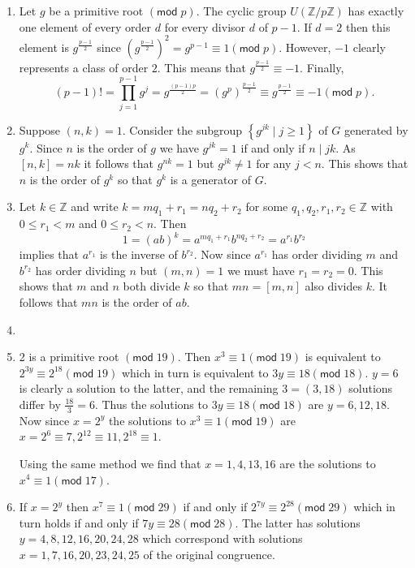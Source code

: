 \documentclass[12pt]{article}
\renewcommand{\pmod}[1]{\left(\mathsf{mod}\;#1\right)}
\begin{document}
\begin{enumerate}
\item Let $g$ be a primitive root $\pmod{p}$.
The cyclic group $U\left(\mathbb{Z}/p\mathbb{Z}\right)$
has exactly one element of every order $d$ for every divisor
$d$ of $p-1$. If $d=2$ then this element is $g^{\frac{p-1}{2}}$
since $\left(g^{\frac{p-1}{2}}\right)^2=g^{p-1}\equiv 1\pmod{p}$.
However, $-1$ clearly represents a class of order $2$.
This means that $g^{\frac{p-1}{2}}\equiv -1$.
Finally,
\[\left(p-1\right)!=\prod_{j=1}^{p-1}g^j
=g^{\frac{\left(p-1\right)p}{2}}
=\left(g^p\right)^{\frac{p-1}{2}}
\equiv g^{\frac{p-1}{2}}
\equiv -1\pmod{p}.\]

\item\label{CyclicGenerators} %
Suppose $\left(n,k\right)=1$.
Consider the subgroup 
$\left\{g^{jk}\mid j\ge 1\right\}$
of $G$ generated by $g^k$.
Since $n$ is the order of $g$ we have $g^{jk}=1$
if and only if $n\mid jk$. As $\left[n,k\right]=nk$
it follows that $g^{nk}=1$ but $g^{jk}\ne 1$ for any $j<n$.
This shows that $n$ is the order of $g^k$
so that $g^k$ is a generator of $G$.

\item %
Let $k\in\mathbb{Z}$ and write $k=mq_1+r_1=nq_2+r_2$ for
some $q_1,q_2,r_1,r_2\in\mathbb{Z}$ with $0\le r_1<m$ and $0\le r_2<n$. Then 
\[1=\left(ab\right)^k=a^{mq_1+r_1}b^{nq_2+r_2}=a^{r_1}b^{r_2}\]
implies that $a^{r_1}$ is the inverse of $b^{r_2}$.
Now since $a^{r_1}$ has order dividing $m$ and $b^{r_2}$
has order dividing $n$ but $\left(m,n\right)=1$ we must
have $r_1=r_2=0$. This shows that $m$ and $n$ both divide $k$
so that $mn=\left[m,n\right]$ also divides $k$. It follows
that $mn$ is the order of $ab$.

\item %

\item %
2 is a primitive root $\pmod{19}$. Then $x^3\equiv 1\pmod{19}$
is equivalent to $2^{3y}\equiv 2^{18}\pmod{19}$
which in turn is equivalent to $3y\equiv 18\pmod{18}$.
$y=6$ is clearly a solution to the latter, and the remaining
$3=\left(3,18\right)$ solutions differ by $\frac{18}{3}=6$.
Thus the solutions to $3y\equiv 18\pmod{18}$ are $y=6,12,18$.
Now since $x=2^y$ the solutions to $x^3\equiv 1\pmod{19}$
are $x=2^6\equiv 7,
2^{12}\equiv 11,2^{18}\equiv 1$. 

Using the same method we find that $x=1,4,13,16$ are the solutions
to $x^4\equiv 1\pmod{17}$.

\item\label{X7E29} %
If $x=2^y$ then $x^7\equiv 1\pmod{29}$ if and only
if $2^{7y}\equiv 2^{28}\pmod{29}$ which in turn holds
if and only if $7y\equiv 28\pmod{28}$. The latter has solutions
$y=4,8,12,16,20,24,28$ which correspond with solutions
$x=1,7,16,20,23,24,25$ of the original congruence.


\end{enumerate}
\end{document}
